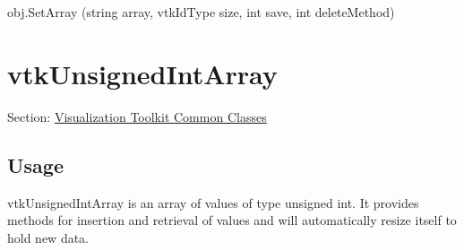 \begin{DoxyItemize}
\item {\ttfamily obj.\-Set\-Array (string array, vtk\-Id\-Type size, int save, int delete\-Method)}  
\end{DoxyItemize}\hypertarget{vtkcommon_vtkunsignedintarray}{}\section{vtk\-Unsigned\-Int\-Array}\label{vtkcommon_vtkunsignedintarray}
Section\-: \hyperlink{sec_vtkcommon}{Visualization Toolkit Common Classes} \hypertarget{vtkwidgets_vtkxyplotwidget_Usage}{}\subsection{Usage}\label{vtkwidgets_vtkxyplotwidget_Usage}
vtk\-Unsigned\-Int\-Array is an array of values of type unsigned int. It provides methods for insertion and retrieval of values and will automatically resize itself to hold new data.

